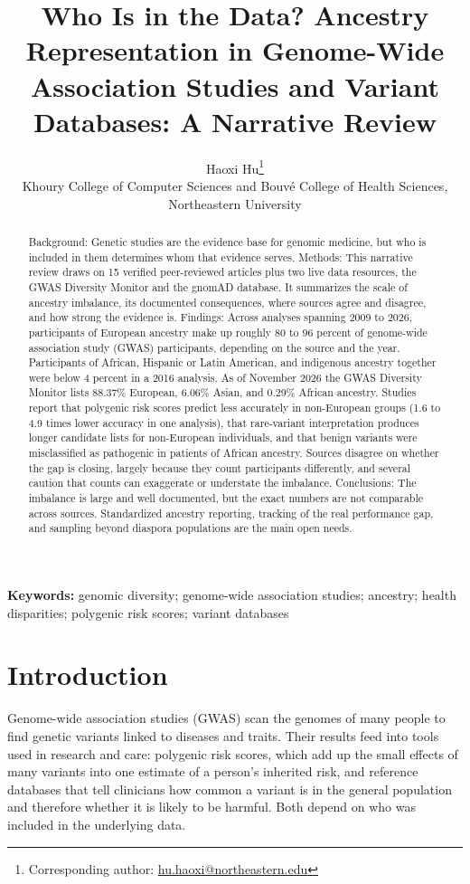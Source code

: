 \documentclass[12pt]{article}
\title{Who Is in the Data? Ancestry Representation in Genome-Wide Association Studies and Variant Databases: A Narrative Review}
\author{Haoxi Hu\thanks{Corresponding author: \href{mailto:hu.haoxi@northeastern.edu}{hu.haoxi@northeastern.edu}}\\[2pt]
\small Khoury College of Computer Sciences and Bouv\'e College of Health Sciences,\\
\small Northeastern University}
\date{}
\begin{document}
\maketitle
\vspace{-2em}
\begin{abstract}
Background: Genetic studies are the evidence base for genomic medicine, but who is included in them determines whom that evidence serves. Methods: This narrative review draws on 15 verified peer-reviewed articles plus two live data resources, the GWAS Diversity Monitor and the gnomAD database. It summarizes the scale of ancestry imbalance, its documented consequences, where sources agree and disagree, and how strong the evidence is. Findings: Across analyses spanning 2009 to 2026, participants of European ancestry make up roughly 80 to 96 percent of genome-wide association study (GWAS) participants, depending on the source and the year. Participants of African, Hispanic or Latin American, and indigenous ancestry together were below 4 percent in a 2016 analysis. As of November 2026 the GWAS Diversity Monitor lists 88.37\% European, 6.06\% Asian, and 0.29\% African ancestry. Studies report that polygenic risk scores predict less accurately in non-European groups (1.6 to 4.9 times lower accuracy in one analysis), that rare-variant interpretation produces longer candidate lists for non-European individuals, and that benign variants were misclassified as pathogenic in patients of African ancestry. Sources disagree on whether the gap is closing, largely because they count participants differently, and several caution that counts can exaggerate or understate the imbalance. Conclusions: The imbalance is large and well documented, but the exact numbers are not comparable across sources. Standardized ancestry reporting, tracking of the real performance gap, and sampling beyond diaspora populations are the main open needs.
\end{abstract}
\noindent\textbf{Keywords:} genomic diversity; genome-wide association studies; ancestry; health disparities; polygenic risk scores; variant databases

\section*{Introduction}
Genome-wide association studies (GWAS) scan the genomes of many people to find genetic variants linked to diseases and traits. Their results feed into tools used in research and care: polygenic risk scores, which add up the small effects of many variants into one estimate of a person's inherited risk, and reference databases that tell clinicians how common a variant is in the general population and therefore whether it is likely to be harmful. Both depend on who was included in the underlying data.
\end{document}
